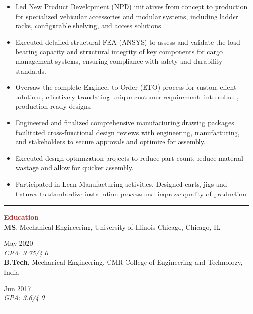 \documentclass[11pt, letterpaper]{article}
\begin{document}
\begin{itemize}[leftmargin=*, label=\textbullet]
\setlength\itemsep{-2pt}
\vspace{-8pt}
\item Led New Product Development (NPD) initiatives from concept to production for specialized vehicular accessories and modular systems, including ladder racks, configurable shelving, and access solutions.
\item Executed detailed structural FEA (ANSYS) to assess and validate the load-bearing capacity and structural integrity of key components for cargo management systems, ensuring compliance with safety and durability standards.
\item Oversaw the complete Engineer-to-Order (ETO) process for custom client solutions, effectively translating unique customer requirements into robust, production-ready designs.
\item Engineered and finalized comprehensive manufacturing drawing packages; facilitated cross-functional design reviews with engineering, manufacturing, and stakeholders to secure approvals and optimize for assembly.
\item Executed design optimization projects to reduce part count, reduce material wastage and allow for quicker assembly.
\item Participated in Lean Manufacturing activities. Designed carts, jigs and fixtures to standardize installation process and improve quality of production.
\end{itemize}
\vspace{-8pt}
\noindent \rule[2pt]{\textwidth}{0.5pt}
\noindent \textbf{\large \textcolor{Brown}{Education}}\vspace{2pt}\\
\textbf{MS}, Mechanical Engineering, University of Illinois Chicago, Chicago, IL \hfill \raggedright{May 2020}\\
\textit{GPA: 3.75/4.0}\\
\vspace{6pt}
\textbf{B.Tech}, Mechanical Engineering, CMR College of Engineering and Technology, India \hfill \raggedright{Jun 2017}\\
\textit{GPA: 3.6/4.0}\\
\vspace{-2pt}
 \noindent \rule[2pt]{\textwidth}{0.5pt}
\end{document}
